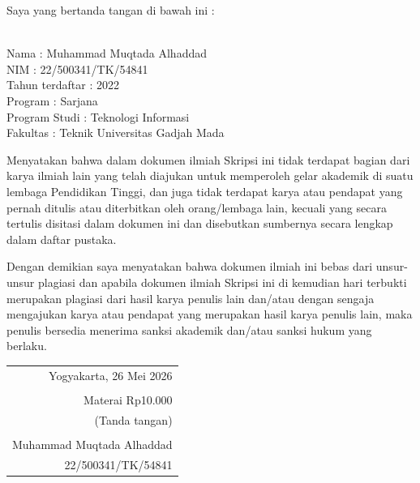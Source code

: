 \noindent Saya yang bertanda tangan di bawah ini :

\vspace{-1em}

\begin{tabbing}
\hspace{40mm} \= \\ %
\noindent Nama \> : Muhammad Muqtada Alhaddad \\[\parskip]
\noindent NIM \> : 22/500341/TK/54841 \\[\parskip]
\noindent Tahun terdaftar \> : 2022 \\[\parskip]
\noindent Program \> : Sarjana \\[\parskip]
\noindent Program Studi \> : Teknologi Informasi \\[\parskip]
\noindent Fakultas \> : Teknik Universitas Gadjah Mada
\end{tabbing}

\noindent Menyatakan bahwa dalam dokumen ilmiah Skripsi ini tidak terdapat bagian dari karya ilmiah lain yang telah diajukan untuk memperoleh gelar akademik di suatu lembaga Pendidikan Tinggi, dan juga tidak terdapat karya atau pendapat yang pernah ditulis atau diterbitkan oleh orang/lembaga lain, kecuali yang secara tertulis disitasi dalam dokumen ini dan disebutkan sumbernya secara lengkap dalam daftar pustaka.

\noindent Dengan demikian saya menyatakan bahwa dokumen ilmiah ini bebas dari unsur-unsur plagiasi dan apabila dokumen ilmiah Skripsi ini di kemudian hari terbukti merupakan plagiasi dari hasil karya penulis lain dan/atau dengan sengaja mengajukan karya atau pendapat yang merupakan hasil karya penulis lain, maka penulis bersedia menerima sanksi akademik dan/atau sanksi hukum yang berlaku.


\begin{flushright}
	\begin{tabular}{r}
		Yogyakarta, 26 Mei 2026 \\
		\vspace{0.1cm} \\
		\tiny{Materai Rp10.000} \\
		\tiny{(Tanda tangan)} \\	
		\vspace{0.1cm} \\
		Muhammad Muqtada Alhaddad \\ 22/500341/TK/54841
	\end{tabular}
\end{flushright}
